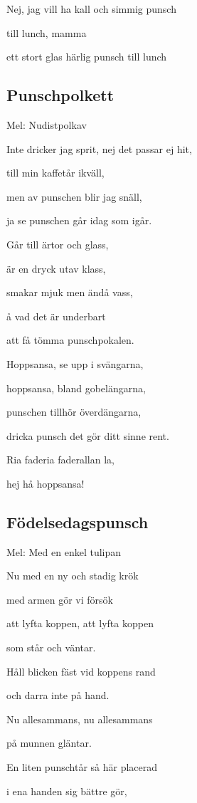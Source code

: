 Nej, jag vill ha kall och simmig punsch

till lunch, mamma

ett stort glas härlig punsch till lunch

\subsection{\textbf{Punschpolkett}}

Mel: Nudistpolkav\bigskip

Inte dricker jag sprit, nej det passar ej hit,

till min kaffetår ikväll,

men av punschen blir jag snäll,

ja se punschen går idag som igår.

Går till ärtor och glass,

är en dryck utav klass,

smakar mjuk men ändå vass,

å vad det är underbart

att få tömma punschpokalen.\bigskip

Hoppsansa, se upp i svängarna,

hoppsansa, bland gobelängarna,

punschen tillhör överdängarna,

dricka punsch det gör ditt sinne rent.\bigskip

Ria faderia faderallan la,

hej hå hoppsansa!

\subsection{\textbf{Födelsedagspunsch}}

Mel: Med en enkel tulipan\bigskip


Nu med en ny och stadig krök

med armen gör vi försök

att lyfta koppen, att lyfta koppen

som står och väntar.

Håll blicken fäst vid koppens rand

och darra inte på hand.

Nu allesammans, nu allesammans

på munnen gläntar.

En liten punschtår så här placerad

i ena handen sig bättre gör,

